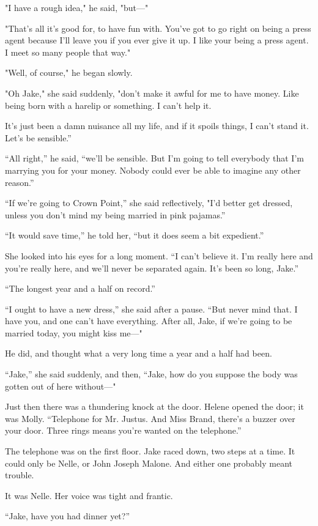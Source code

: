 \documentclass{novel}
\begin{document}
"I have a rough idea," he said, "but—"

"That's all it's good for, to have fun with. You've got to go right on being a press agent because I'll leave you if you ever give it up. I like your being a press agent. I meet so many people that way."

"Well, of course," he began slowly.

"Oh Jake," she said suddenly, "don't make it awful for me to have money. Like being born with a harelip or something. I can't help it.

It’s just been a damn nuisance all my life, and if it spoils things, I can’t stand it. Let’s be sensible.”

“All right,” he said, “we’ll be sensible. But I’m going to tell everybody that I'm marrying you for your money. Nobody could ever be able to imagine any other reason.”

“If we’re going to Crown Point,” she said reflectively, "I'd better get dressed, unless you don’t mind my being married in pink pajamas.”

“It would save time,” he told her, “but it does seem a bit expedient.”

She looked into his eyes for a long moment. “I can’t believe it. I'm really here and you’re really here, and we’ll never be separated again. It’s been so long, Jake.”

“The longest year and a half on record.”

“I ought to have a new dress,” she said after a pause. “But never mind that. I have you, and one can’t have everything. After all, Jake, if we’re going to be married today, you might kiss me—"

He did, and thought what a very long time a year and a half had been.

“Jake,” she said suddenly, and then, “Jake, how do you suppose the body was gotten out of here without—"

Just then there was a thundering knock at the door. Helene opened the door; it was Molly. “Telephone for Mr. Justus. And Miss Brand, there’s a buzzer over your door. Three rings means you’re wanted on the telephone.”

The telephone was on the first floor. Jake raced down, two steps at a time. It could only be Nelle, or John Joseph Malone. And either one probably meant trouble.

It was Nelle. Her voice was tight and frantic.

“Jake, have you had dinner yet?”
\end{document}
